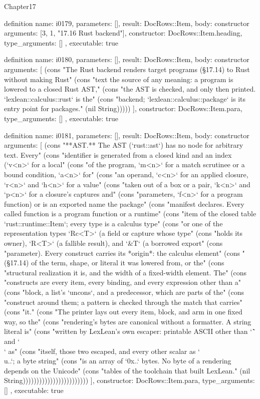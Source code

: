 \begin{lexlean}{Chapter17}
\begin{semanticmodule}
definition{
  name: i0179,
  parameters: [],
  result: DocRows::Item,
  body: constructor{
    arguments: [3, 1, "17.16 Rust backend"],
    constructor: DocRows::Item.heading,
    type_arguments: []
  },
  executable: true
}

definition{
  name: i0180,
  parameters: [],
  result: DocRows::Item,
  body: constructor{
    arguments: [
      (cons "The Rust backend renders target programs (§17.14) to Rust without making Rust" (cons "text the source of any meaning: a program is lowered to a closed Rust AST," (cons "the AST is checked, and only then printed. `lexlean::calculus::rust` is the" (cons "backend; `lexlean::calculus::package` is its entry point for packages." (nil String)))))
    ],
    constructor: DocRows::Item.para,
    type_arguments: []
  },
  executable: true
}

definition{
  name: i0181,
  parameters: [],
  result: DocRows::Item,
  body: constructor{
    arguments: [
      (cons "**AST.** The AST (`rust::ast`) has no node for arbitrary text. Every" (cons "identifier is generated from a closed kind and an index (`v<n>` for a local" (cons "of the program, `m<n>` for a match scrutinee or a bound condition, `a<n>` for" (cons "an operand, `c<n>` for an applied closure, `r<n>` and `h<n>` for a value" (cons "taken out of a box or a pair, `k<n>` and `p<n>` for a closure's captures and" (cons "parameters, `f<n>` for a program function) or is an exported name the package" (cons "manifest declares. Every called function is a program function or a runtime" (cons "item of the closed table `rust::runtime::Item`; every type is a calculus type" (cons "or one of the representation types `Rc<T>` (a field or capture whose type" (cons "holds its owner), `R<T>` (a fallible result), and `&T` (a borrowed export" (cons "parameter). Every construct carries its *origin*: the calculus element" (cons "(§17.14) of the term, shape, or literal it was lowered from, or the" (cons "structural realization it is, and the width of a fixed-width element. The" (cons "constructs are every item, every binding, and every expression other than a" (cons "block, a list's `uncons`, and a predecessor, which are parts of the" (cons "construct around them; a pattern is checked through the match that carries" (cons "it." (cons "The printer lays out every item, block, and arm in one fixed way, so the" (cons "rendering's bytes are canonical without a formatter. A string literal is" (cons "written by LexLean's own escaper: printable ASCII other than `\"` and `\\` as" (cons "itself, those two escaped, and every other scalar as `\\u{..}`; a byte string" (cons "is an array of `0x..` bytes. No byte of a rendering depends on the Unicode" (cons "tables of the toolchain that built LexLean." (nil String))))))))))))))))))))))))
    ],
    constructor: DocRows::Item.para,
    type_arguments: []
  },
  executable: true
}


\end{semanticmodule}
\end{lexlean}
